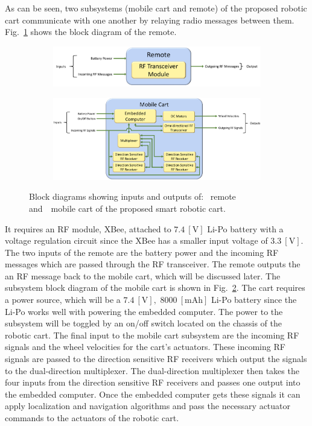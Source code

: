\documentclass[conference]{IEEEtran}
\begin{document}
As can be seen, two subsystems (mobile cart and remote) of the proposed robotic cart communicate with one another by relaying radio messages between them. Fig.~\ref{fig:remote_block_diag} shows the block diagram of the remote. %
%
\begin{figure}[htbp]
  \begin{subfigure}[b]{0.9\linewidth}
    \centering
    \includegraphics[width=\textwidth]{figs/remoteBlockDiagram.pdf}
    \caption{}
    \label{fig:remote_block_diag}
  \end{subfigure}
  \begin{subfigure}[b]{0.9\linewidth}
    \centering
    \includegraphics[width=\textwidth]{figs/mobileCartBlockDiagram.pdf}
    \caption{}
    \label{fig:mobile_block_diag}
  \end{subfigure}
  \caption{Block diagrams showing inputs and outputs of:~ remote and~~mobile cart of the proposed smart robotic cart.}
  \label{fig:blockDiagramRemoteMobileCart}
\end{figure}
%
It requires an RF module, XBee, attached to $7.4~[\si{\volt}]$ Li-Po battery
with a voltage regulation circuit since the XBee has a smaller input voltage of
$3.3~[\si{\volt}].$ The two inputs of the remote are the battery power and the
incoming RF messages which are passed through the RF transceiver. The remote
outputs the an RF message back to the mobile cart, which will be discussed
later. The subsystem block diagram of the mobile cart is shown in
Fig.~\ref{fig:mobile_block_diag}. The cart requires a power source, which will
be a $7.4~[\si{\volt}],$ $8000~[\si{\milli\ampere\hour}]$ Li-Po battery since the Li-Po works well with powering the
embedded computer. The power to the subsystem will be toggled
by an on/off switch located on the chassis of the robotic cart. The final input
to the mobile cart subsystem are the incoming RF signals and the wheel velocities for the cart's actuators. These incoming RF
signals are passed to the direction sensitive RF receivers which output the
signals to the dual-direction multiplexer. The dual-direction multiplexer then
takes the four inputs from the direction sensitive RF receivers and passes one
output into the embedded computer. Once the embedded computer gets these signals
it can apply localization and navigation algorithms and pass the necessary actuator commands to the actuators of the robotic cart. 
\end{document}
